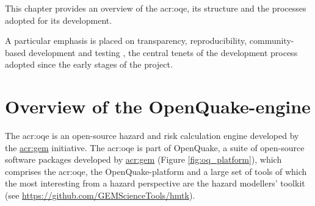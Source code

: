 This chapter provides an overview of the \gls{acr:oqe}, 
its structure and the processes adopted for its development. 

A particular emphasis is placed on transparency, reproducibility,
community-based development and testing \parencite{pagani2014}, 
the central tenets of the development process adopted since the early stages of the project. 
%
\section{Overview of the OpenQuake-engine}
%
The \gls{acr:oqe} is an open-source hazard and risk calculation engine 
developed by the 
\href{http://globalquakemodel.org}{\gls{acr:gem}} initiative.
%
The \gls{acr:oqe} is part of OpenQuake, a suite of open-source software packages
developed by \href{http://globalquakemodel.org}{\gls{acr:gem}} (Figure
\ref{fig:oq_platform}), which comprises the \gls{acr:oqe}, the
OpenQuake-platform and a large set of tools of which the most interesting from a
hazard perspective are the hazard modellers' toolkit (see
\href{https://github.com/GEMScienceTools/hmtk}
{https://github.com/GEMScienceTools/hmtk}).

